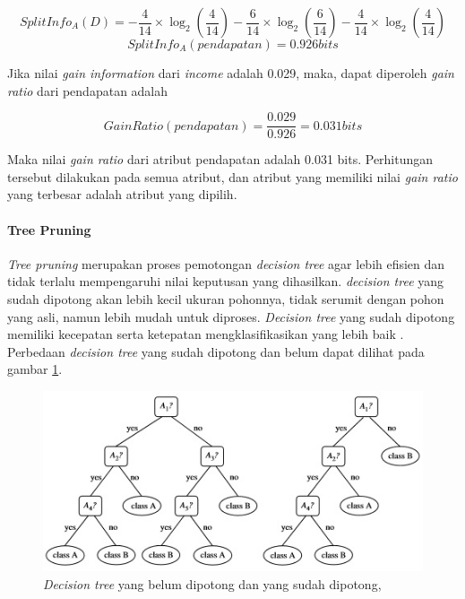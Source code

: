 \begin{displaymath}
	SplitInfo_A(D) = - \frac{4}{14} \times \log_2 (\frac{4}{14}) - \frac{6}{14} \times \log_2 (\frac{6}{14}) - \frac{4}{14} \times \log_2 (\frac{4}{14})
\end{displaymath} 
\begin{displaymath}
	SplitInfo_A(pendapatan) = 0.926 bits
\end{displaymath} 

Jika nilai \textsl{gain information} dari \textsl{income} adalah 0.029, maka, dapat diperoleh \textsl{gain ratio} dari pendapatan adalah

\begin{displaymath}
	GainRatio(pendapatan) = \frac{0.029}{0.926} = 0.031 bits
\end{displaymath}

Maka nilai \textsl{gain ratio} dari atribut pendapatan adalah 0.031 bits. Perhitungan tersebut dilakukan pada semua atribut, dan atribut yang memiliki nilai \textsl{gain ratio} yang terbesar adalah atribut yang dipilih.
\paragraph{Tree Pruning}
	
\textsl{Tree pruning} merupakan proses pemotongan \textsl{decision tree} agar lebih efisien dan tidak terlalu mempengaruhi nilai keputusan yang dihasilkan. \textsl{decision tree} yang sudah dipotong akan lebih kecil ukuran pohonnya, tidak serumit dengan pohon yang asli, namun lebih mudah untuk diproses. \textsl{Decision tree} yang sudah dipotong memiliki kecepatan serta ketepatan mengklasifikasikan yang lebih baik \cite{DM}. Perbedaan \textsl{decision tree} yang sudah dipotong dan belum dapat dilihat pada gambar \ref{fig:treePruning}.

\begin{figure}
\includegraphics[scale=1]{Gambar/treepruning.jpg}
\caption[\textsl{Decision Tree Pruned}]{\textsl{Decision tree} yang belum dipotong dan yang sudah dipotong, \cite{DM}} 
\label{fig:treePruning}
\end{figure}

